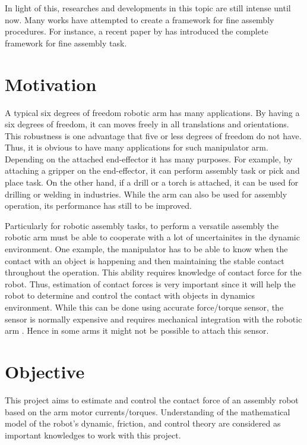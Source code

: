 In light of this, researches and developments in this topic are still intense until now. Many works have attempted to create a framework for fine assembly procedures. For instance, a recent paper by \cite{cuong15} has introduced the complete framework for fine assembly task.

\section{Motivation}

A typical six degrees of freedom robotic arm has many applications. By having a six degrees of freedom, it can moves freely in all translations and orientations. This robustness is one advantage that five or less degrees of freedom do not have. Thus, it is obvious to have many applications for such manipulator arm. Depending on the attached end-effector it has many purposes. For example, by attaching a gripper on the end-effector, it can perform assembly task or pick and place task. On the other hand, if a drill or a torch is attached, it can be used for drilling or welding in industries. While the arm can also be used for assembly operation, its performance has still to be improved. 

Particularly for robotic assembly tasks, to perform a versatile assembly the robotic arm must be able to cooperate with a lot of uncertainites in the dynamic environment. One example, the manipulator has to be able to know when the contact with an object is happening and then maintaining the stable contact throughout the operation. This ability requires knowledge of contact force for the robot. Thus, estimation of contact forces is very important since it will help the robot to determine and control the contact with objects in dynamics environment. While this can be done using accurate force/torque sensor, the sensor is normally expensive and requires mechanical integration with the robotic arm \cite{Hao15}. Hence in some arms it might not be possible to attach this sensor.  
 
\section{Objective}

This project aims to estimate and control the contact force of an assembly robot based on the arm motor currents/torques. Understanding of the mathematical model of the robot’s dynamic, friction, and control theory are considered as important knowledges to work with this project.


